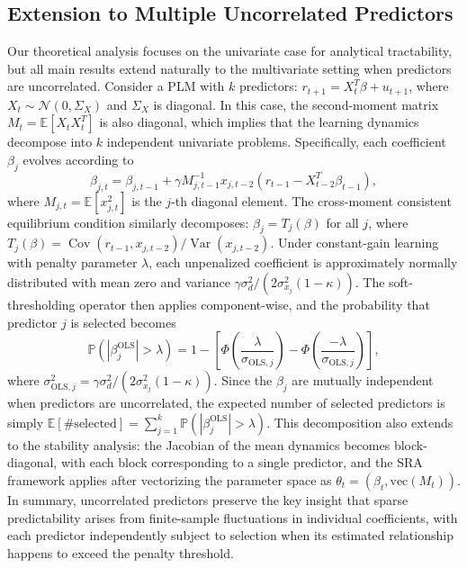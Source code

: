 \documentclass[11pt]{article}
\begin{document}
\subsection{Extension to Multiple Uncorrelated Predictors}

Our theoretical analysis focuses on the univariate case for analytical tractability, but all main results extend naturally to the multivariate setting when predictors are uncorrelated.
Consider a PLM with $k$ predictors: $r_{t+1} = X_t^T \beta + u_{t+1}$, where $X_t \sim \mathcal{N}(0, \Sigma_X)$ and $\Sigma_X$ is diagonal.
In this case, the second-moment matrix $M_t = \mathbb{E}[X_t X_t^T]$ is also diagonal, which implies that the learning dynamics decompose into $k$ independent univariate problems.
Specifically, each coefficient $\beta_j$ evolves according to
\begin{equation}
\beta_{j,t} = \beta_{j,t-1} + \gamma M^{-1}_{j,t-1} x_{j,t-2} \left(r_{t-1} - X_{t-2}^T \beta_{t-1}\right),
\end{equation}
where $M_{j,t} = \mathbb{E}[x_{j,t}^2]$ is the $j$-th diagonal element.
The cross-moment consistent equilibrium condition similarly decomposes: $\beta_j = T_j(\beta)$ for all $j$, where $T_j(\beta) = \operatorname{Cov}(r_{t-1}, x_{j,t-2})/\operatorname{Var}(x_{j,t-2})$.
Under constant-gain learning with penalty parameter $\lambda$, each unpenalized coefficient is approximately normally distributed with mean zero and variance $\gamma \sigma_d^2/(2\sigma^2_{x_j}(1-\kappa))$.
The soft-thresholding operator then applies component-wise, and the probability that predictor $j$ is selected becomes
\begin{equation}
\mathbb{P}(|\beta^{\text{OLS}}_j| > \lambda) = 1 - \left[\Phi\left(\frac{\lambda}{\sigma_{\text{OLS},j}}\right) - \Phi\left(\frac{-\lambda}{\sigma_{\text{OLS},j}}\right)\right],
\end{equation}
where $\sigma_{\text{OLS},j}^2 = \gamma \sigma_d^2/(2\sigma^2_{x_j}(1-\kappa))$.
Since the $\beta_j$ are mutually independent when predictors are uncorrelated, the expected number of selected predictors is simply $\mathbb{E}[\text{\# selected}] = \sum_{j=1}^k \mathbb{P}(|\beta^{\text{OLS}}_j| > \lambda)$.
This decomposition also extends to the stability analysis: the Jacobian of the mean dynamics becomes block-diagonal, with each block corresponding to a single predictor, and the SRA framework applies after vectorizing the parameter space as $\theta_t = (\beta_t, \text{vec}(M_t))$.
In summary, uncorrelated predictors preserve the key insight that sparse predictability arises from finite-sample fluctuations in individual coefficients, with each predictor independently subject to selection when its estimated relationship happens to exceed the penalty threshold.
\end{document}
